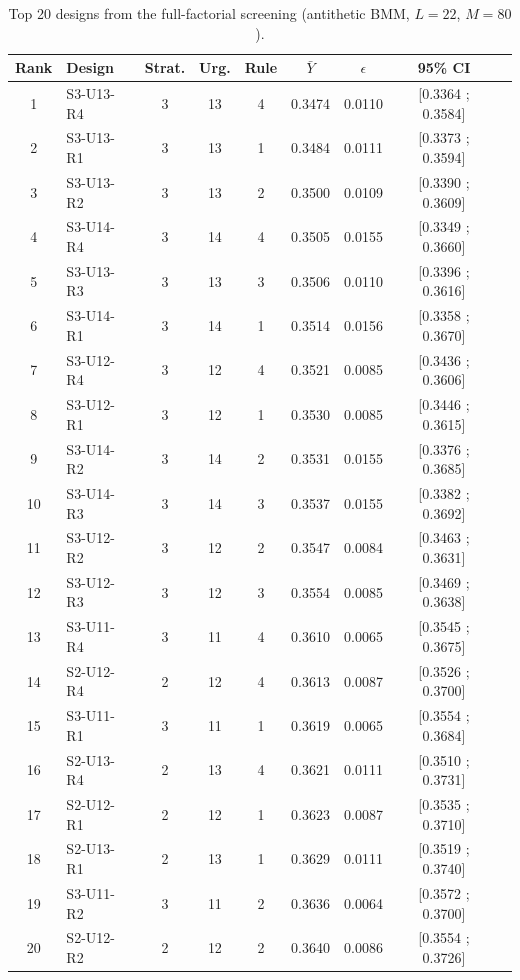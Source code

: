 \documentclass[12pt, a4paper]{article}
\newcommand{\headerrow}{\rowcolor{ugblue}\color{white}}
\newcommand{\altrow}{\rowcolor{rowgray}}
\begin{document}
\begin{table}[ht]
\centering
\caption{Top 20 designs from the full-factorial screening (antithetic BMM, $L=22$, $M=80$).}
\label{tab:top20}
\small
\begin{tabular}{clccccccc}
\toprule
\headerrow
\textbf{Rank} & \textbf{Design} & \textbf{Strat.} & \textbf{Urg.} & \textbf{Rule} & $\bar{Y}$ & $\epsilon$ & \textbf{95\% CI} \\
\midrule
1  & S3-U13-R4 & 3 & 13 & 4 & 0.3474 & 0.0110 & [0.3364 ; 0.3584] \\
\altrow 2  & S3-U13-R1 & 3 & 13 & 1 & 0.3484 & 0.0111 & [0.3373 ; 0.3594] \\
3  & S3-U13-R2 & 3 & 13 & 2 & 0.3500 & 0.0109 & [0.3390 ; 0.3609] \\
\altrow 4  & S3-U14-R4 & 3 & 14 & 4 & 0.3505 & 0.0155 & [0.3349 ; 0.3660] \\
5  & S3-U13-R3 & 3 & 13 & 3 & 0.3506 & 0.0110 & [0.3396 ; 0.3616] \\
\altrow 6  & S3-U14-R1 & 3 & 14 & 1 & 0.3514 & 0.0156 & [0.3358 ; 0.3670] \\
7  & S3-U12-R4 & 3 & 12 & 4 & 0.3521 & 0.0085 & [0.3436 ; 0.3606] \\
\altrow 8  & S3-U12-R1 & 3 & 12 & 1 & 0.3530 & 0.0085 & [0.3446 ; 0.3615] \\
9  & S3-U14-R2 & 3 & 14 & 2 & 0.3531 & 0.0155 & [0.3376 ; 0.3685] \\
\altrow 10 & S3-U14-R3 & 3 & 14 & 3 & 0.3537 & 0.0155 & [0.3382 ; 0.3692] \\
11 & S3-U12-R2 & 3 & 12 & 2 & 0.3547 & 0.0084 & [0.3463 ; 0.3631] \\
\altrow 12 & S3-U12-R3 & 3 & 12 & 3 & 0.3554 & 0.0085 & [0.3469 ; 0.3638] \\
13 & S3-U11-R4 & 3 & 11 & 4 & 0.3610 & 0.0065 & [0.3545 ; 0.3675] \\
\altrow 14 & S2-U12-R4 & 2 & 12 & 4 & 0.3613 & 0.0087 & [0.3526 ; 0.3700] \\
15 & S3-U11-R1 & 3 & 11 & 1 & 0.3619 & 0.0065 & [0.3554 ; 0.3684] \\
\altrow 16 & S2-U13-R4 & 2 & 13 & 4 & 0.3621 & 0.0111 & [0.3510 ; 0.3731] \\
17 & S2-U12-R1 & 2 & 12 & 1 & 0.3623 & 0.0087 & [0.3535 ; 0.3710] \\
\altrow 18 & S2-U13-R1 & 2 & 13 & 1 & 0.3629 & 0.0111 & [0.3519 ; 0.3740] \\
19 & S3-U11-R2 & 3 & 11 & 2 & 0.3636 & 0.0064 & [0.3572 ; 0.3700] \\
\altrow 20 & S2-U12-R2 & 2 & 12 & 2 & 0.3640 & 0.0086 & [0.3554 ; 0.3726] \\
\bottomrule
\end{tabular}
\end{table}
\end{document}
